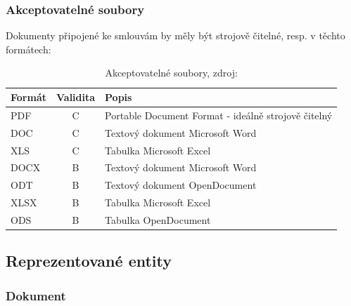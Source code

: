 \subsubsection*{Akceptovatelné soubory}

Dokumenty připojené ke smlouvám by měly být strojově čitelné, resp. v těchto formátech:

\begin{table}[h]
\centering
\begin{tabular}{lcl}
\textbf{Formát} & \textbf{Validita} & \textbf{Popis} \\
\hline
\rowcolor{validateC}PDF & C & Portable Document Format - ideálně strojově čitelný \\
\rowcolor{validateC}DOC & C & Textový dokument Microsoft Word \\
\rowcolor{validateC}XLS & C & Tabulka Microsoft Excel \\
\rowcolor{validateB}DOCX & B & Textový dokument Microsoft Word \\
\rowcolor{validateB}ODT & B & Textový dokument OpenDocument \\
\rowcolor{validateB}XLSX & B & Tabulka Microsoft Excel \\
\rowcolor{validateB}ODS & B & Tabulka OpenDocument \\
\end{tabular}
\caption[Akceptovatelné soubory]{Akceptovatelné soubory, zdroj:\cite{metodika, standard}}
\end{table}

\newpage

\subsection{Reprezentované entity}

\medskip

\subsubsection*{Dokument}

